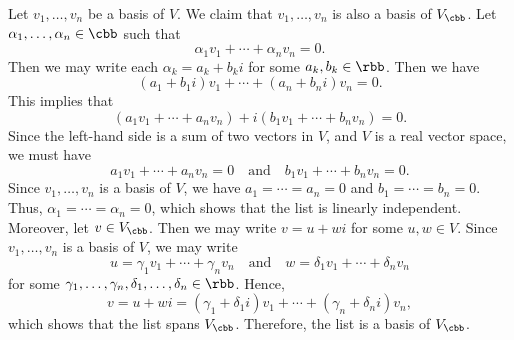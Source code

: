 \begin{sol}
    Let $v_1, \ldots, v_n$ be a basis of $V$.
	We claim that $v_1, \ldots, v_n$ is also a basis of $V_\cbb$.
	Let $\alpha_1, \ldots, \alpha_n \in \cbb$ such that
    \[
    	\alpha_1 v_1 + \cdots + \alpha_n v_n = 0.
    \]
    Then we may write each $\alpha_k = a_k + b_k i$ for some $a_k, b_k \in \rbb$.
	Then we have
    \[
    	(a_1 + b_1 i)v_1 + \cdots + (a_n + b_n i)v_n = 0.
    \]
    This implies that
    \[
    	(a_1 v_1 + \cdots + a_n v_n) + i(b_1 v_1 + \cdots + b_n v_n) = 0.
    \]
    Since the left-hand side is a sum of two vectors in $V$, and $V$ is a real vector space, we must have
    \[
    	a_1 v_1 + \cdots + a_n v_n = 0 \quad \text{and} \quad b_1 v_1 + \cdots + b_n v_n = 0.
    \]
    Since $v_1, \ldots, v_n$ is a basis of $V$, we have $a_1 = \cdots = a_n = 0$ and $b_1 = \cdots = b_n = 0$.
	Thus, $\alpha_1 = \cdots = \alpha_n = 0$, which shows that the list is linearly independent.
	Moreover, let $v \in V_\cbb$.
	Then we may write $v = u + w i$ for some $u, w \in V$.
	Since $v_1, \ldots, v_n$ is a basis of $V$, we may write
    \[
    	u = \gamma_1 v_1 + \cdots + \gamma_n v_n \quad \text{and} \quad w = \delta_1 v_1 + \cdots + \delta_n v_n
    \]
    for some $\gamma_1, \ldots, \gamma_n, \delta_1, \ldots, \delta_n \in \rbb$.
	Hence,
    \[
    	v = u + w i = (\gamma_1 + \delta_1 i)v_1 + \cdots + (\gamma_n + \delta_n i)v_n,
    \]
    which shows that the list spans $V_\cbb$.
	Therefore, the list is a basis of $V_\cbb$.
\end{sol}
